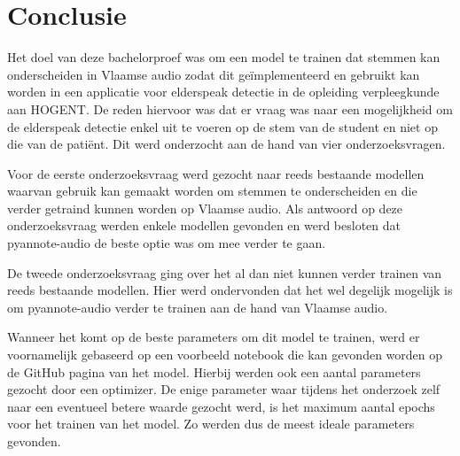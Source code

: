 
\chapter{Conclusie}%
\label{ch:conclusie}


Het doel van deze bachelorproef was om een model te trainen dat stemmen kan onderscheiden in Vlaamse audio zodat dit geïmplementeerd en gebruikt kan worden in een applicatie voor elderspeak detectie in de opleiding verpleegkunde aan HOGENT. De reden hiervoor was dat er vraag was naar een mogelijkheid om de elderspeak detectie enkel uit te voeren op de stem van de student en niet op die van de patiënt. Dit werd onderzocht aan de hand van vier onderzoeksvragen.

Voor de eerste onderzoeksvraag werd gezocht naar reeds bestaande modellen waarvan gebruik kan gemaakt worden om stemmen te onderscheiden en die verder getraind kunnen worden op Vlaamse audio. Als antwoord op deze onderzoeksvraag werden enkele modellen gevonden en werd besloten dat pyannote-audio de beste optie was om mee verder te gaan.

De tweede onderzoeksvraag ging over het al dan niet kunnen verder trainen van reeds bestaande modellen. Hier werd ondervonden dat het wel degelijk mogelijk is om pyannote-audio verder te trainen aan de hand van Vlaamse audio.

Wanneer het komt op de beste parameters om dit model te trainen, werd er voornamelijk gebaseerd op een voorbeeld notebook die kan gevonden worden op de GitHub pagina van het model. Hierbij werden ook een aantal parameters gezocht door een optimizer. De enige parameter waar tijdens het onderzoek zelf naar een eventueel betere waarde gezocht werd, is het maximum aantal epochs voor het trainen van het model. Zo werden dus de meest ideale parameters gevonden.

